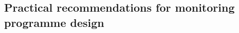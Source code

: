 \documentclass[12pt]{article}
\begin{document}
{%

\subsection{Practical recommendations for monitoring programme design}

%
%
%
%
%
%

}
\end{document}
